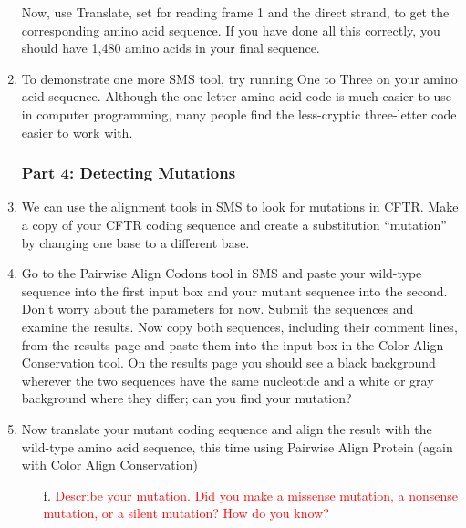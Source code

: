 \begin{enumerate}
Now, use Translate, set for reading frame 1 and the direct strand, to get the corresponding amino acid sequence.  If you have done all this correctly, you should have 1,480 amino acids in your final sequence.
	\item To demonstrate one more SMS tool, try running One to Three on your amino acid sequence.  Although the one-letter amino acid code is much easier to use in computer programming, many people find the less-cryptic three-letter code easier to work with.

	\subsubsection*{Part 4: Detecting Mutations}
	\item We can use the alignment tools in SMS to look for mutations in CFTR.  Make a copy of your CFTR coding sequence and create a substitution ``mutation'' by changing one base to a different base.
	\item  Go to the Pairwise Align Codons tool in SMS and paste your wild-type sequence into the first input box and your mutant sequence into the second.  Don’t worry about the parameters for now.  Submit the sequences and examine the results.  Now copy both sequences, including their comment lines, from the results page and paste them into the input box in the Color Align Conservation tool.  On the results page you should see a black background wherever the two sequences have the same nucleotide and a white or gray background where they differ; can you find your mutation?
	\item  Now translate your mutant coding sequence and align the result with the wild-type amino acid sequence, this time using Pairwise Align Protein (again with Color Align Conservation)
	\begin{itemize}
		\item[f.] \textcolor{red}{Describe your mutation.  Did you make a missense mutation, a nonsense mutation, or a silent mutation?  How do you know?}
	\end{itemize}
	

\end{enumerate}
